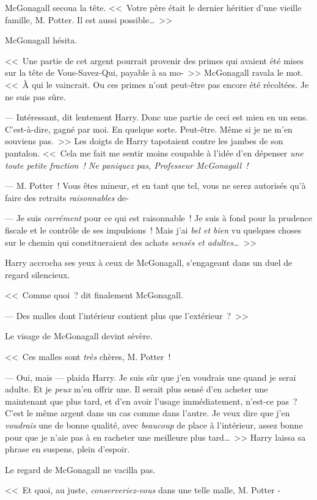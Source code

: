 McGonagall secoua la tête. <<~Votre père était le dernier héritier d'une vieille famille, M. Potter. Il est aussi possible…~>>

McGonagall hésita.

<<~Une partie de cet argent pourrait provenir des primes qui avaient été mises sur la tête de Vous-Savez-Qui, payable à sa mo-~>> McGonagall ravala le mot. <<~À qui le vaincrait. Ou ces primes n'ont peut-être pas encore été récoltées. Je ne suis pas sûre.

--- Intéressant, dit lentement Harry. Donc une partie de ceci est mien en un sens. C'est-à-dire, gagné par moi. En quelque sorte. Peut-être. Même si je ne m'en souviens pas.~>> Les doigts de Harry tapotaient contre les jambes de son pantalon. <<~Cela me fait me sentir moins coupable à l'idée d'en dépenser \emph{une toute petite fraction~! Ne paniquez pas, Professeur McGonagall~!}

--- M. Potter~! Vous êtes mineur, et en tant que tel, vous ne serez autorisés qu'à faire des retraits \emph{raisonnables} de-

--- Je suis \emph{carrément} pour ce qui est raisonnable~! Je suis à fond pour la prudence fiscale et le contrôle de ses impulsions~! Mais j'ai \emph{bel et bien} vu quelques choses sur le chemin qui constitueraient des achats \emph{sensés et adultes…}~>>

Harry accrocha ses yeux à ceux de McGonagall, s'engageant dans un duel de regard silencieux.

<<~Comme quoi~? dit finalement McGonagall.

--- Des malles dont l'intérieur contient plus que l'extérieur~?~>>

Le visage de McGonagall devint sévère.

<<~Ces malles sont \emph{très} chères, M. Potter~!

--- Oui, mais — plaida Harry. Je suis sûr que j'en voudrais une quand je serai adulte. Et je \emph{peux} m'en offrir une. Il serait plus sensé d'en acheter une maintenant que plus tard, et d'en avoir l'usage immédiatement, n'est-ce pas~? C'est le même argent dans un cas comme dans l'autre. Je veux dire que j'en \emph{voudrais} une de bonne qualité, avec \emph{beaucoup} de place à l'intérieur, assez bonne pour que je n'aie pas à en racheter une meilleure plus tard…~>> Harry laissa sa phrase en suspens, plein d'espoir.

Le regard de McGonagall ne vacilla pas.

<<~Et quoi, au juste, \emph{conserveriez-vous} dans une telle malle, M. Potter -

